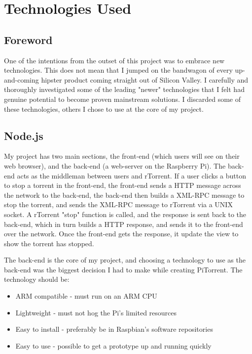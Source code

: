 \chapter{Technologies Used} 

\label{Chapter2} 



\section{Foreword}
One of the intentions from the outset of this project was to embrace new technologies. This does not mean that I jumped on the bandwagon of every up-and-coming hipster product coming straight out of Silicon Valley. I carefully and thoroughly investigated some of the leading "newer" technologies that I felt had genuine potential to become proven mainstream solutions. I discarded some of these technologies, others I chose to use at the core of my project. 


\section{Node.js}
My project has two main sections, the front-end (which users will see on their web browser), and the back-end (a web-server on the Raspberry Pi). The back-end acts as the middleman between users and rTorrent. If a user clicks a button to stop a torrent in the front-end, the front-end sends a HTTP message across the network to the back-end, the back-end then builds a XML-RPC message to stop the torrent, and sends the XML-RPC message to rTorrent via a UNIX socket. A rTorrent "stop" function is called, and the response is sent back to the back-end, which in turn builds a HTTP response, and sends it to the front-end over the network. Once the front-end gets the response, it update the view to show the torrent has stopped.

The back-end is the core of my project, and choosing a technology to use as the back-end was the biggest decision I had to make while creating PiTorrent. The technology should be:

\begin{itemize}
	\item ARM compatible - must run on an ARM CPU
	\item Lightweight - must not hog the Pi's limited resources
	\item Easy to install - preferably be in Raspbian's software repositories 
	\item Easy to use - possible to get a prototype up and running quickly
\end{itemize}

